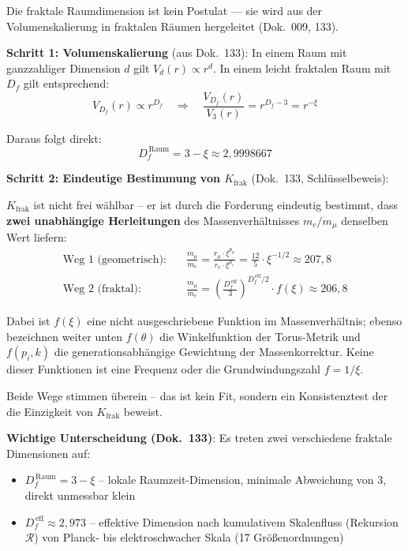 Die fraktale Raumdimension ist kein Postulat — sie wird aus der
Volumenskalierung in fraktalen Räumen hergeleitet (Dok.~009, 133).

\textbf{Schritt 1: Volumenskalierung} (aus Dok.~133):
In einem Raum mit ganzzahliger Dimension $d$ gilt $V_d(r) \propto r^d$.
In einem leicht fraktalen Raum mit $D_f$ gilt entsprechend:
\begin{equation}
    V_{D_f}(r) \propto r^{D_f}
    \quad \Rightarrow \quad
    \frac{V_{D_f}(r)}{V_3(r)} = r^{D_f - 3} = r^{-\xi}
\end{equation}

Daraus folgt direkt:
\begin{equation}
    \boxed{D_f^{\,\text{Raum}} = 3 - \xi \approx 2{,}9998667}
\end{equation}

\textbf{Schritt 2: Eindeutige Bestimmung von $K_{\text{frak}}$}
(Dok.~133, Schlüsselbeweis):

$K_{\text{frak}}$ ist nicht frei wählbar -- er ist durch die Forderung
eindeutig bestimmt, dass \textbf{zwei unabhängige Herleitungen} des
Massenverhältnisses $m_e/m_\mu$ denselben Wert liefern:
\begin{align}
    \text{Weg 1 (geometrisch):} &\quad
    \frac{m_\mu}{m_e} = \frac{r_\mu \cdot \xi^{p_\mu}}{r_e \cdot \xi^{p_e}}
    = \frac{12}{5} \cdot \xi^{-1/2} \approx 207{,}8 \\
    \text{Weg 2 (fraktal):} &\quad
    \frac{m_\mu}{m_e} = \left(\frac{D_f^{\,\text{eff}}}{3}\right)^{\!D_f^{\,\text{eff}}/2}
    \cdot f(\xi) \approx 206{,}8
\end{align}

Dabei ist $f(\xi)$ eine nicht ausgeschriebene Funktion im
Massenverhältnis; ebenso bezeichnen weiter unten $f(\theta)$ die
Winkelfunktion der Torus-Metrik und $f(p_i,k)$ die generationsabhängige
Gewichtung der Massenkorrektur. Keine dieser Funktionen ist eine Frequenz
oder die Grundwindungszahl $f = 1/\xi$.

Beide Wege stimmen überein -- das ist kein Fit, sondern ein
Konsistenztest der die Einzigkeit von $K_{\text{frak}}$ beweist.

\textbf{Wichtige Unterscheidung (Dok.~133)}: Es treten zwei
verschiedene fraktale Dimensionen auf:
\begin{itemize}
    \item $D_f^{\,\text{Raum}} = 3 - \xi$ -- lokale Raumzeit-Dimension,
          minimale Abweichung von 3, direkt unmessbar klein
    \item $D_f^{\,\text{eff}} \approx 2{,}973$ -- effektive Dimension
          nach kumulativem Skalenfluss (Rekursion $\mathcal{R}$) von Planck- bis
          elektroschwacher Skala (17 Größenordnungen)
\end{itemize}

